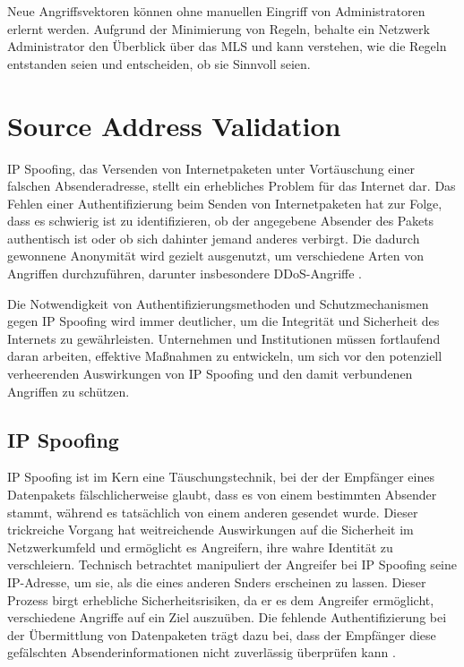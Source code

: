 \documentclass[sigplan,screen]{acmart}
\begin{document}
Neue Angriffsvektoren können ohne manuellen Eingriff von Administratoren erlernt werden. Aufgrund der Minimierung von Regeln, behalte ein Netzwerk Administrator den Überblick über das MLS und kann verstehen, wie die Regeln entstanden seien und entscheiden, ob sie Sinnvoll seien.

\section{Source Address Validation}
IP Spoofing, das Versenden von Internetpaketen unter Vortäuschung einer falschen Absenderadresse, stellt ein erhebliches Problem für das Internet dar. Das Fehlen einer Authentifizierung beim Senden von Internetpaketen hat zur Folge, dass es schwierig ist zu identifizieren, ob der angegebene Absender des Pakets authentisch ist oder ob sich dahinter jemand anderes verbirgt. Die dadurch gewonnene Anonymität wird gezielt ausgenutzt, um verschiedene Arten von Angriffen durchzuführen, darunter insbesondere DDoS-Angriffe \cite{Kor01} \cite{ Gorilla01}.
 
Die Notwendigkeit von Authentifizierungsmethoden und Schutzmechanismen gegen IP Spoofing wird immer deutlicher, um die Integrität und Sicherheit des Internets zu gewährleisten. Unternehmen und Institutionen müssen fortlaufend daran arbeiten, effektive Maßnahmen zu entwickeln, um sich vor den potenziell verheerenden Auswirkungen von IP Spoofing und den damit verbundenen Angriffen zu schützen.

\subsection{IP Spoofing}
IP Spoofing ist im Kern eine Täuschungstechnik, bei der der Empfänger eines Datenpakets fälschlicherweise glaubt, dass es von einem bestimmten Absender stammt, während es tatsächlich von einem anderen gesendet wurde. Dieser trickreiche Vorgang hat weitreichende Auswirkungen auf die Sicherheit im Netzwerkumfeld und ermöglicht es Angreifern, ihre wahre Identität zu verschleiern.
Technisch betrachtet manipuliert der Angreifer bei IP Spoofing seine IP-Adresse, um sie, als die eines anderen Snders erscheinen zu lassen. Dieser Prozess birgt erhebliche Sicherheitsrisiken, da er es dem Angreifer ermöglicht, verschiedene Angriffe auf ein Ziel auszuüben. Die fehlende Authentifizierung bei der Übermittlung von Datenpaketen trägt dazu bei, dass der Empfänger diese gefälschten Absenderinformationen nicht zuverlässig überprüfen kann \cite{Beverly01}.
\end{document}

